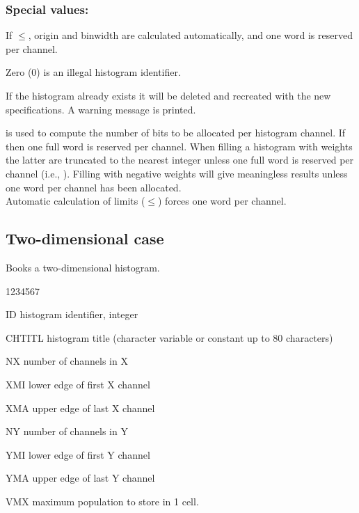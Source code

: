 \subsubsection*{Special values:}
\begin{UL}
\item If $\leq$, origin and binwidth are
      calculated automatically, and one word is reserved per channel.
\item Zero (0) is an illegal histogram identifier.
\item If the histogram  already exists it will be deleted and
      recreated with the new specifications. A warning message is printed.
\item {} is used to compute the number
      of bits to be allocated per histogram channel.
      If  then one full word is reserved per channel.
      When filling a histogram with weights the latter are
      truncated to the nearest integer unless one full word is
      reserved per channel (i.e., ).
      Filling with negative weights will give meaningless results
      unless one word per channel has been allocated.\\
      Automatic calculation of limits ($\leq$)
      forces one word per channel.
\end{UL}

\subsection{Two-dimensional case}


\Action Books a two-dimensional histogram.
\Idesc
\begin{DLttc}{1234567}
\item[ID] histogram identifier, integer
\item[CHTITL] histogram title  
              (character variable or constant up to 80 characters)
\item[NX] number of channels in X
\item[XMI] lower edge of first X channel
\item[XMA] upper edge of last X channel
\item[NY] number of channels in Y
\item[YMI] lower edge of first Y channel
\item[YMA] upper edge of last Y channel
\item[VMX] maximum population to store in 1 cell.
\end{DLttc}

